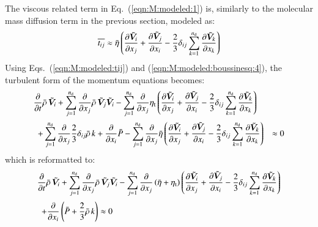 \documentclass{warpdoc}
\newcommand{\alb}{\vspace{0.2cm}\\} %
\newcommand{\nd}{{{n}_{\rm d}}}
\newcommand{\turb}{_{\rm t}}
\newcommand{\etat}{{\eta\turb}}
\newcommand{\mfd}{\displaystyle}
\begin{document}
The viscous related term in Eq.\ (\ref{eqn:M:modeled:1}) is, similarly
to the molecular mass diffusion term in the previous section, modeled as:
%
\begin{equation}
  \overline{t_{ij}}  \approx 
     \wbar{\eta} \left( \frac{\partial {\wtilde{\bm{V}}_i}}{\partial x_j}
              +  \frac{\partial {\wtilde{\bm{V}}_j}}{\partial x_i}
              -  \frac{2}{3} \delta_{ij} \sum_{k=1}^{\nd} \frac{\partial {\wtilde{\bm{V}}_k}}{\partial x_k}
         \right)
  \label{eqn:M:modeled:tij}
\end{equation}
%
Using Eqs.\ (\ref{eqn:M:modeled:tij}) and (\ref{eqn:M:modeled:boussinesq:4}),
the turbulent form of the momentum equations becomes:
%
\begin{equation}
 \begin{array}{ll}
  \mfd\frac{\partial}{\partial t}  \wbar{\rho}\,  {\wtilde{\bm{V}}_i}
      +  \sum_{j=1}^{\nd} \frac{\partial }{\partial x_j}
             \wbar{\rho}\, {\wtilde{\bm{V}}_j} {\wtilde{\bm{V}}_i}
      - \sum_{j=1}^{\nd} \frac{\partial }{\partial x_j}
            \etat
          \left(
                \frac{\partial {\wtilde{\bm{V}}_i}}{\partial x_j}
              + \frac{\partial {\wtilde{\bm{V}}_j}}{\partial x_i}
              - \frac{2}{3} \delta_{ij} \sum_{k=1}^\nd \frac{\partial {\wtilde{\bm{V}}_k}}{\partial x_k}
          \right) & \alb
     ~~\mfd + \sum_{j=1}^{\nd} \frac{\partial }{\partial x_j}
          \frac{2}{3} \delta_{ij} \wbar{\rho}\, k
      +  \frac{\partial }{\partial x_i} \wbar{P}
      -  \sum_{j=1}^{\nd} \frac{\partial }{\partial x_j} 
        \wbar{\eta}
          \left( \frac{\partial {\wtilde{\bm{V}}_i}}{\partial x_j}
              +  \frac{\partial {\wtilde{\bm{V}}_j}}{\partial x_i}
              -  \frac{2}{3} \delta_{ij} \sum_{k=1}^{\nd} \frac{\partial {\wtilde{\bm{V}}_k}}{\partial x_k}
          \right)
     &\approx 0
 \end{array}
 \label{eqn:M:modeled:2}
\end{equation}
%
which is reformatted to:
%
\begin{equation}
 \begin{array}{l}
  \mfd\frac{\partial}{\partial t}  \wbar{\rho}\,  {\wtilde{\bm{V}}_i}
      +  \sum_{j=1}^{\nd} \frac{\partial }{\partial x_j}
             \wbar{\rho}\, {\wtilde{\bm{V}}_j} {\wtilde{\bm{V}}_i}
      - \sum_{j=1}^{\nd} \frac{\partial }{\partial x_j}
            \left( \wbar{\eta}+\etat \right)
          \left(
                \frac{\partial {\wtilde{\bm{V}}_i}}{\partial x_j}
              + \frac{\partial {\wtilde{\bm{V}}_j}}{\partial x_i}
              - \frac{2}{3} \delta_{ij} \sum_{k=1}^\nd \frac{\partial {\wtilde{\bm{V}}_k}}{\partial x_k}
          \right) \alb
     ~~\mfd  +  \frac{\partial }{\partial x_i} \left( \wbar{P}  +  \frac{2}{3} \wbar{\rho}\, k\right)
      \approx 0 
 \end{array}
 \label{eqn:M:modeled:final}
\end{equation}
%
\end{document}
